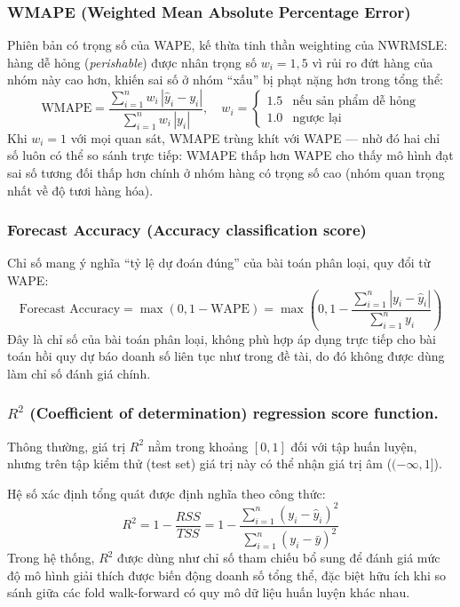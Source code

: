 \documentclass[12pt,a4paper]{report}
\begin{document}
\subsubsection{WMAPE (Weighted Mean Absolute Percentage Error)}
Phiên bản có trọng số của WAPE, kế thừa tinh thần weighting của NWRMSLE: hàng dễ hỏng
(\textit{perishable}) được nhân trọng số $w_i = 1{,}5$ vì rủi ro đứt hàng của nhóm này
cao hơn, khiến sai số ở nhóm ``xấu'' bị phạt nặng hơn trong tổng thể:
\[
    \mathrm{WMAPE} = \frac{\displaystyle\sum_{i=1}^{n} w_i\,|\hat{y}_i - y_i|}
                         {\displaystyle\sum_{i=1}^{n} w_i\,|y_i|}, \quad
    w_i = \begin{cases} 1.5 & \text{nếu sản phẩm dễ hỏng} \\ 1.0 & \text{ngược lại} \end{cases}
\]
Khi $w_i = 1$ với mọi quan sát, WMAPE trùng khít với WAPE --- nhờ đó hai chỉ số luôn có
thể so sánh trực tiếp: WMAPE thấp hơn WAPE cho thấy mô hình đạt sai số tương đối thấp
hơn chính ở nhóm hàng có trọng số cao (nhóm quan trọng nhất về độ tươi hàng hóa).

\subsubsection{Forecast Accuracy (Accuracy classification score)}
Chỉ số mang ý nghĩa ``tỷ lệ dự đoán đúng'' của bài toán phân loại, quy đổi từ WAPE:
\[
\text{Forecast Accuracy} = \max\left(0, 1 - \text{WAPE}\right) = \max\left(0, 1 - \frac{\displaystyle\sum_{i=1}^{n} |y_i - \hat{y}_i|}{\displaystyle\sum_{i=1}^{n} y_i}\right)
\]
Đây là chỉ số của bài toán phân loại, không phù hợp áp dụng trực tiếp cho bài toán hồi
quy dự báo doanh số liên tục như trong đề tài, do đó không được dùng làm chỉ số đánh
giá chính.

\subsubsection{ $R^2$ (Coefficient of determination) regression score function.}

Thông thường, giá trị $R^2$ nằm trong khoảng $[0, 1]$ đối với tập huấn luyện, nhưng trên tập kiểm thử (test set) giá trị này có thể nhận giá trị âm ($(-\infty, 1]$).

Hệ số xác định tổng quát được định nghĩa theo công thức:
\[
    R^2 = 1 - \frac{RSS}{TSS} = 1 - \frac{\displaystyle\sum_{i=1}^{n} (y_i - \hat{y}_i)^2}{\displaystyle\sum_{i=1}^{n} (y_i - \bar{y})^2}
\]
Trong hệ thống, $R^2$ được dùng như chỉ số tham chiếu bổ sung để đánh giá mức độ mô
hình giải thích được biến động doanh số tổng thể, đặc biệt hữu ích khi so sánh giữa
các fold walk-forward có quy mô dữ liệu huấn luyện khác nhau.
\end{document}
